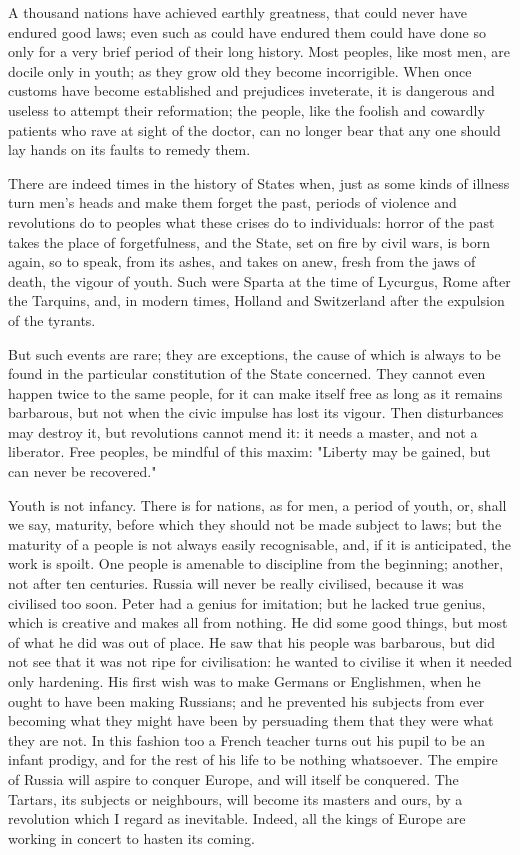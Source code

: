\documentclass[12pt]{report}
\begin{document}
A thousand nations have achieved earthly greatness, that could never have endured good laws; even such as could have endured them could have done so only for a very brief period of their long history. Most peoples, like most men, are docile only in youth; as they grow old they become incorrigible. When once customs have become established and prejudices inveterate, it is dangerous and useless to attempt their reformation; the people, like the foolish and cowardly patients who rave at sight of the doctor, can no longer bear that any one should lay hands on its faults to remedy them.

There are indeed times in the history of States when, just as some kinds of illness turn men's heads and make them forget the past, periods of violence and revolutions do to peoples what these crises do to individuals: horror of the past takes the place of forgetfulness, and the State, set on fire by civil wars, is born again, so to speak, from its ashes, and takes on anew, fresh from the jaws of death, the vigour of youth. Such were Sparta at the time of Lycurgus, Rome after the Tarquins, and, in modern times, Holland and Switzerland after the expulsion of the tyrants.

But such events are rare; they are exceptions, the cause of which is always to be found in the particular constitution of the State concerned. They cannot even happen twice to the same people, for it can make itself free as long as it remains barbarous, but not when the civic impulse has lost its vigour. Then disturbances may destroy it, but revolutions cannot mend it: it needs a master, and not a liberator. Free peoples, be mindful of this maxim: "Liberty may be gained, but can never be recovered."

Youth is not infancy. There is for nations, as for men, a period of youth, or, shall we say, maturity, before which they should not be made subject to laws; but the maturity of a people is not always easily recognisable, and, if it is anticipated, the work is spoilt. One people is amenable to discipline from the beginning; another, not after ten centuries. Russia will never be really civilised, because it was civilised too soon. Peter had a genius for imitation; but he lacked true genius, which is creative and makes all from nothing. He did some good things, but most of what he did was out of place. He saw that his people was barbarous, but did not see that it was not ripe for civilisation: he wanted to civilise it when it needed only hardening. His first wish was to make Germans or Englishmen, when he ought to have been making Russians; and he prevented his subjects from ever becoming what they might have been by persuading them that they were what they are not. In this fashion too a French teacher turns out his pupil to be an infant prodigy, and for the rest of his life to be nothing whatsoever. The empire of Russia will aspire to conquer Europe, and will itself be conquered. The Tartars, its subjects or neighbours, will become its masters and ours, by a revolution which I regard as inevitable. Indeed, all the kings of Europe are working in concert to hasten its coming.
\end{document}
